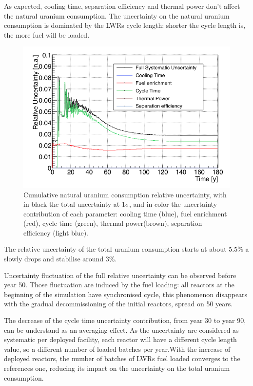 \documentclass{anstrans}
\begin{document}
As expected, cooling time, separation efficiency and thermal power don't
affect the natural uranium consumption.  The uncertainty on the natural uranium
consumption is dominated by the \glspl{LWR} cycle length: shorter the cycle
length is, the more fuel will be loaded.


\begin{figure}[h!!] %
    \centering
    \includegraphics[scale=0.35]{unat_uncer}
    \caption{Cumulative natural uranium consumption relative uncertainty, with
    in black the total uncertainty at 1$\sigma$, and in color the uncertainty
    contribution of each parameter: cooling time (blue), fuel enrichment (red),
    cycle time (green), thermal power(brown), separation efficiency (light
    blue).}\label{fig:unatr_uncer}
\end{figure}
The relative uncertainty of the total uranium consumption starts at about
$5.5\%$ a slowly drops and stabilise around $3\%$.

Uncertainty fluctuation of the full relative uncertainty can be observed before
year 50.  Those fluctuation are induced by the fuel loading: all reactors at the
beginning of the simulation have synchronised cycle, this phenomenon disappears
with the gradual decommissioning of the initial reactors, spread on 50 years.

The decrease of the cycle time uncertainty contribution, from year 30 to year
90, can be understand as an averaging effect.  As the uncertainty are considered
as systematic per deployed facility, each reactor will have a different cycle
length value, so a different number of loaded batches per year.With the increase
of deployed reactors, the number of batches of \glspl{LWR} fuel loaded converges
to the references one, reducing its impact on the uncertainty on the total
uranium consumption.
\end{document}
